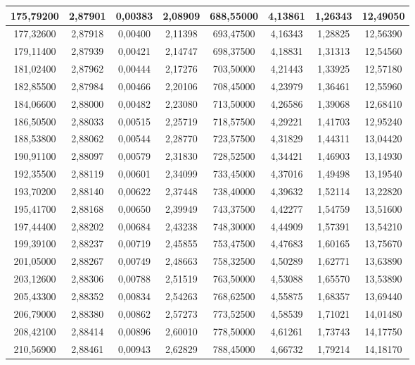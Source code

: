 \documentclass[a4paper,12pt]{article}
\numberwithin{equation}{section}
\begin{document}
\begin{appendices}
\begin{longtable}[c]{|c|c|c|c|c|c|c|c|}
175,79200	&	2,87901	&	0,00383	&	2,08909	&	688,55000	&	4,13861	&	1,26343	&	12,49050	\\\hline
177,32600	&	2,87918	&	0,00400	&	2,11398	&	693,47500	&	4,16343	&	1,28825	&	12,56390	\\\hline
179,11400	&	2,87939	&	0,00421	&	2,14747	&	698,37500	&	4,18831	&	1,31313	&	12,54560	\\\hline
181,02400	&	2,87962	&	0,00444	&	2,17276	&	703,50000	&	4,21443	&	1,33925	&	12,57180	\\\hline
182,85500	&	2,87984	&	0,00466	&	2,20106	&	708,45000	&	4,23979	&	1,36461	&	12,55960	\\\hline
184,06600	&	2,88000	&	0,00482	&	2,23080	&	713,50000	&	4,26586	&	1,39068	&	12,68410	\\\hline
186,50500	&	2,88033	&	0,00515	&	2,25719	&	718,57500	&	4,29221	&	1,41703	&	12,95240	\\\hline
188,53800	&	2,88062	&	0,00544	&	2,28770	&	723,57500	&	4,31829	&	1,44311	&	13,04420	\\\hline
190,91100	&	2,88097	&	0,00579	&	2,31830	&	728,52500	&	4,34421	&	1,46903	&	13,14930	\\\hline
192,35500	&	2,88119	&	0,00601	&	2,34099	&	733,45000	&	4,37016	&	1,49498	&	13,19540	\\\hline
193,70200	&	2,88140	&	0,00622	&	2,37448	&	738,40000	&	4,39632	&	1,52114	&	13,22820	\\\hline
195,41700	&	2,88168	&	0,00650	&	2,39949	&	743,37500	&	4,42277	&	1,54759	&	13,51600	\\\hline
197,44400	&	2,88202	&	0,00684	&	2,43238	&	748,30000	&	4,44909	&	1,57391	&	13,54210	\\\hline
199,39100	&	2,88237	&	0,00719	&	2,45855	&	753,47500	&	4,47683	&	1,60165	&	13,75670	\\\hline
201,05000	&	2,88267	&	0,00749	&	2,48663	&	758,32500	&	4,50289	&	1,62771	&	13,63890	\\\hline
203,12600	&	2,88306	&	0,00788	&	2,51519	&	763,50000	&	4,53088	&	1,65570	&	13,53890	\\\hline
205,43300	&	2,88352	&	0,00834	&	2,54263	&	768,62500	&	4,55875	&	1,68357	&	13,69440	\\\hline
206,79000	&	2,88380	&	0,00862	&	2,57273	&	773,52500	&	4,58539	&	1,71021	&	14,01480	\\\hline
208,42100	&	2,88414	&	0,00896	&	2,60010	&	778,50000	&	4,61261	&	1,73743	&	14,17750	\\\hline
210,56900	&	2,88461	&	0,00943	&	2,62829	&	788,45000	&	4,66732	&	1,79214	&	14,18170	\\\hline

\end{longtable}
\end{appendices}
\end{document}
